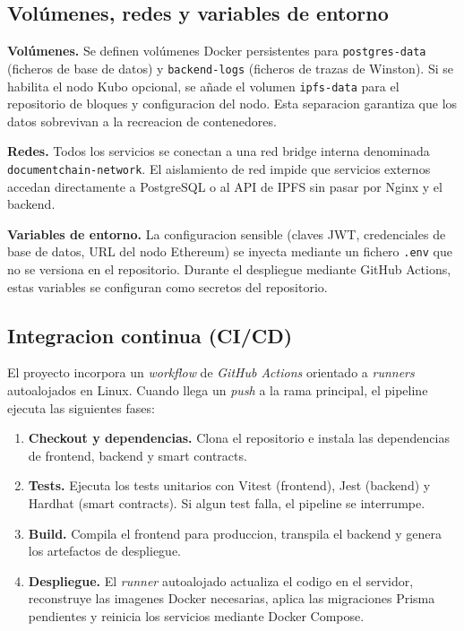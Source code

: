 \documentclass[11pt, a4paper]{article}
\begin{document}
\subsection{Volúmenes, redes y variables de entorno}

\textbf{Volúmenes.} Se definen volúmenes Docker persistentes para \texttt{postgres-data} (ficheros de base de datos) y \texttt{backend-logs} (ficheros de trazas de Winston). Si se habilita el nodo Kubo opcional, se añade el volumen \texttt{ipfs-data} para el repositorio de bloques y configuracion del nodo. Esta separacion garantiza que los datos sobrevivan a la recreacion de contenedores.

\textbf{Redes.} Todos los servicios se conectan a una red bridge interna denominada \texttt{documentchain-network}. El aislamiento de red impide que servicios externos accedan directamente a PostgreSQL o al API de IPFS sin pasar por Nginx y el backend.

\textbf{Variables de entorno.} La configuracion sensible (claves JWT, credenciales de base de datos, URL del nodo Ethereum) se inyecta mediante un fichero \texttt{.env} que no se versiona en el repositorio. Durante el despliegue mediante GitHub Actions, estas variables se configuran como secretos del repositorio.

\subsection{Integracion continua (CI/CD)}

El proyecto incorpora un \textit{workflow} de \textit{GitHub Actions} orientado a \textit{runners} autoalojados en Linux. Cuando llega un \textit{push} a la rama principal, el pipeline ejecuta las siguientes fases:

\begin{enumerate}
    \item \textbf{Checkout y dependencias.} Clona el repositorio e instala las dependencias de frontend, backend y smart contracts.
    \item \textbf{Tests.} Ejecuta los tests unitarios con Vitest (frontend), Jest (backend) y Hardhat (smart contracts). Si algun test falla, el pipeline se interrumpe.
    \item \textbf{Build.} Compila el frontend para produccion, transpila el backend y genera los artefactos de despliegue.
    \item \textbf{Despliegue.} El \textit{runner} autoalojado actualiza el codigo en el servidor, reconstruye las imagenes Docker necesarias, aplica las migraciones Prisma pendientes y reinicia los servicios mediante Docker Compose.
\end{enumerate}
\end{document}
